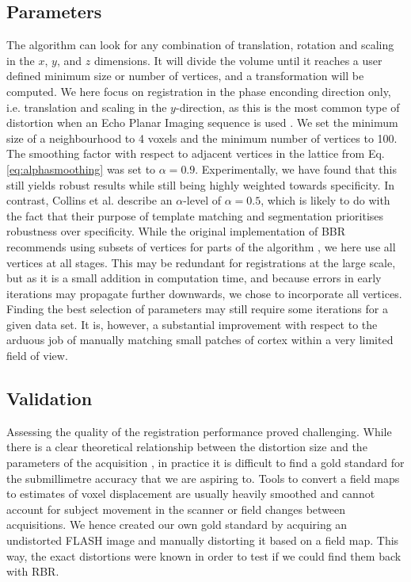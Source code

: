 \subsection*{Parameters}
The algorithm can look for any combination of translation, rotation and scaling in the $x$, $y$, and $z$ dimensions. It will divide the volume until it reaches a user defined minimum size or number of vertices, and a transformation will be computed. We here focus on registration in the phase enconding direction only, i.e. translation and scaling in the $y$-direction, as this is the most common type of distortion when an Echo Planar Imaging sequence is used \citep{Mansfield1977}. We set the minimum size of a neighbourhood to 4 voxels and the minimum number of vertices to 100. The smoothing factor with respect to adjacent vertices in the lattice from Eq.\ref{eq:alphasmoothing} was set to $\alpha=0.9$. Experimentally, we have found that this still yields robust results while still being highly weighted towards specificity. In contrast, Collins et al. \citep{Collins1995} describe an $\alpha$-level of $\alpha=0.5$, which is likely to do with the fact that their purpose of template matching and segmentation prioritises robustness over specificity. While the original implementation of BBR recommends using subsets of vertices for parts of the algorithm \citep{Greve2009}, we here use all vertices at all stages. This may be redundant for registrations at the large scale, but as it is a small addition in computation time, and because errors in early iterations may propagate further downwards, we chose to incorporate all vertices. Finding the best selection of parameters may still require some iterations for a given data set. It is, however, a substantial improvement with respect to the arduous job of manually matching small patches of cortex within a very limited field of view. 

\subsection*{Validation}
Assessing the quality of the registration performance proved challenging. While there is a clear theoretical relationship between the distortion size and the parameters of the acquisition \citep{Jezzard1995}, in practice it is difficult to find a gold standard for the submillimetre accuracy that we are aspiring to. Tools to convert a field maps to estimates of voxel displacement are usually heavily smoothed and cannot account for subject movement in the scanner or field changes between acquisitions. We hence created our own gold standard by acquiring an undistorted FLASH image and manually distorting it based on a field map. This way, the exact distortions were known in order to test if we could find them back with RBR. 

